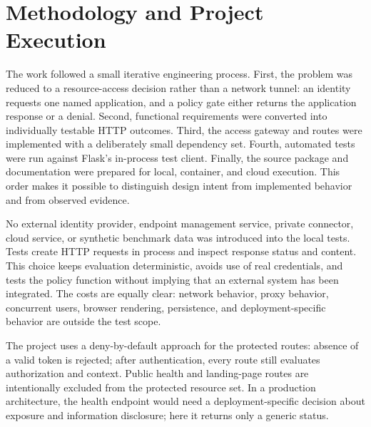 \section{Methodology and Project Execution}
The work followed a small iterative engineering process. First, the problem was reduced to a resource-access decision rather than a network tunnel: an identity requests one named application, and a policy gate either returns the application response or a denial. Second, functional requirements were converted into individually testable HTTP outcomes. Third, the access gateway and routes were implemented with a deliberately small dependency set. Fourth, automated tests were run against Flask's in-process test client. Finally, the source package and documentation were prepared for local, container, and cloud execution. This order makes it possible to distinguish design intent from implemented behavior and from observed evidence.

No external identity provider, endpoint management service, private connector, cloud service, or synthetic benchmark data was introduced into the local tests. Tests create HTTP requests in process and inspect response status and content. This choice keeps evaluation deterministic, avoids use of real credentials, and tests the policy function without implying that an external system has been integrated. The costs are equally clear: network behavior, proxy behavior, concurrent users, browser rendering, persistence, and deployment-specific behavior are outside the test scope.

The project uses a deny-by-default approach for the protected routes: absence of a valid token is rejected; after authentication, every route still evaluates authorization and context. Public health and landing-page routes are intentionally excluded from the protected resource set. In a production architecture, the health endpoint would need a deployment-specific decision about exposure and information disclosure; here it returns only a generic status.

